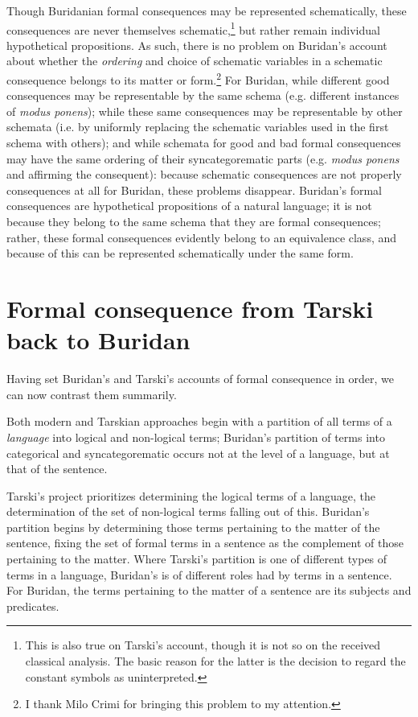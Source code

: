 \documentclass[]{article}
\begin{document}
Though Buridanian formal consequences may be represented schematically, these consequences are never themselves schematic,\footnote{This is also true on Tarski's account, though it is not so on the received classical analysis. The basic reason for the latter is the decision to regard the constant symbols as uninterpreted.} but rather remain individual hypothetical propositions. As such, there is no problem on Buridan's account about whether the \textit{ordering} and choice of schematic variables in a schematic consequence belongs to its matter or form.\footnote{I thank Milo Crimi for bringing this problem to my attention.} For Buridan, while different good consequences may be representable by the same schema (e.g. different instances of \textit{modus ponens}); while these same consequences may be representable by other schemata (i.e. by uniformly replacing the schematic variables used in the first schema with others); and while schemata for good and bad formal consequences may have the same ordering of their syncategorematic parts (e.g. \textit{modus ponens} and affirming the consequent): because schematic consequences are not properly consequences at all for Buridan, these problems disappear. Buridan's formal consequences are hypothetical propositions of a natural language; it is not because they belong to the same schema that they are formal consequences; rather, these formal consequences evidently belong to an equivalence class, and because of this can be represented schematically under the same form.
\section{Formal consequence from Tarski back to Buridan}
Having set Buridan's and Tarski's accounts of formal consequence in order, we can now contrast them summarily. 

Both modern and Tarskian approaches begin with a partition of all terms of a \textit{language} into logical and non-logical terms; Buridan's partition of terms into categorical and syncategorematic occurs not at the level of a language, but at that of the sentence. 

Tarski's project prioritizes determining the logical terms of a language, the determination of the set of non-logical terms falling out of this. Buridan's partition begins by determining those terms pertaining to the matter of the sentence, fixing the set of formal terms in a sentence as the complement of those pertaining to the matter. Where Tarski's partition is one of different types of terms in a language, Buridan's is of different roles had by terms in a sentence. For Buridan, the terms pertaining to the matter of a sentence are its subjects and predicates.
\end{document}
